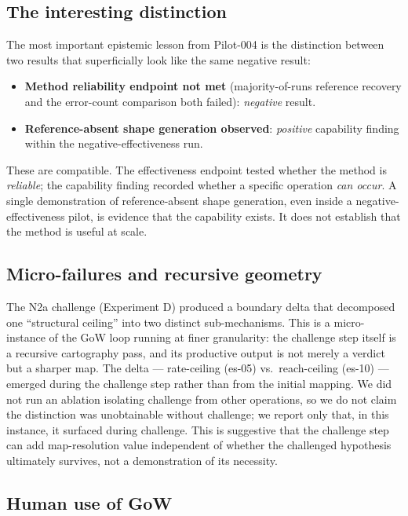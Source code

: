 \documentclass[11pt]{article}
\theoremstyle{gowthm}
\theoremstyle{gowplain}
\begin{document}
\subsection{The interesting distinction}

The most important epistemic lesson from Pilot-004 is the distinction between
two results that superficially look like the same negative result:

\begin{itemize}[nosep]
  \item \textbf{Method reliability endpoint not met} (majority-of-runs
    reference recovery and the error-count comparison both failed):
    \emph{negative} result.
  \item \textbf{Reference-absent shape generation observed}: \emph{positive}
    capability finding within the negative-effectiveness run.
\end{itemize}

These are compatible. The effectiveness endpoint tested whether the method is
\emph{reliable}; the capability finding recorded whether a specific operation
\emph{can occur}. A single demonstration of reference-absent shape generation,
even inside a negative-effectiveness pilot, is evidence that the capability
exists. It does not establish that the method is useful at scale.

\subsection{Micro-failures and recursive geometry}

The N2a challenge (Experiment D) produced a boundary delta that decomposed one
``structural ceiling'' into two distinct sub-mechanisms. This is a micro-instance
of the GoW loop running at finer granularity: the challenge step itself is a
recursive cartography pass, and its productive output is not merely a verdict
but a sharper map. The delta --- rate-ceiling (es-05) vs.\ reach-ceiling (es-10)
--- emerged during the challenge step rather than from the initial mapping. We
did not run an ablation isolating challenge from other operations, so we do not
claim the distinction was unobtainable without challenge; we report only that,
in this instance, it surfaced during challenge. This is suggestive that the
challenge step can add map-resolution value independent of whether the
challenged hypothesis ultimately survives, not a demonstration of its necessity.

\subsection{Human use of GoW}
\end{document}
